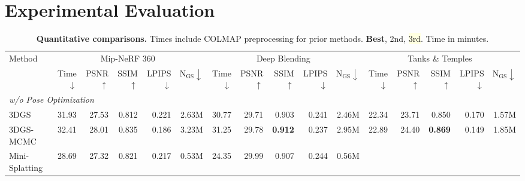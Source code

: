 \documentclass[sigconf]{acmart}
\begin{document}
\section{Experimental Evaluation}
\label{sec:experiments}

\begin{table}[t!]
    \centering
    \footnotesize
    \setlength\tabcolsep{1.5pt}
    \caption{
        \textbf{Quantitative comparisons.} Times include COLMAP preprocessing for prior methods. \colorbox{lightred}{\bf Best}, \colorbox{lightorange}{2nd}, \colorbox{lightyellow}{3rd}. Time in minutes.
    }
    \begin{tabular} {l | rrrrr | rrrrr | rrrrr}
        \toprule
        \multirow{2}{*}{Method}
        & \multicolumn{5}{c}{Mip-NeRF 360~\cite{barron2022mip}}  & \multicolumn{5}{c}{Deep Blending~\cite{hedman2018deep}} & \multicolumn{5}{c}{Tanks \& Temples~\cite{knapitsch2017tanks}} \\
        \cmidrule(l{2pt}r{2pt}){2-6} \cmidrule(l{2pt}r{2pt}){7-11} \cmidrule(l{2pt}r{2pt}){12-16}
         & Time$\downarrow$ & PSNR$\uparrow$ & SSIM$\uparrow$ & LPIPS$\downarrow$ & $\mathrm{N_{GS}}\downarrow$
        & Time$\downarrow$ & PSNR$\uparrow$ & SSIM$\uparrow$ & LPIPS$\downarrow$ & $\mathrm{N_{GS}}\downarrow$
        & Time$\downarrow$ & PSNR$\uparrow$ & SSIM$\uparrow$ & LPIPS$\downarrow$ & $\mathrm{N_{GS}}\downarrow$\\
        \midrule
        \multicolumn{16}{l}{\textit{w/o Pose Optimization}} \\
        \midrule
        3DGS~\cite{kerbl3Dgaussians}
            & 31.93 & 27.53 & 0.812 & 0.221 & 2.63M
            & 30.77 & 29.71 & 0.903 & \cellcolor{tabthird}0.241 & 2.46M
            & 22.34 & 23.71 & 0.850 & 0.170 & 1.57M\\
        3DGS-MCMC~\cite{mcmc3dgs}
            & 32.41 & \cellcolor{tabthird}28.01 & \cellcolor{tabthird}0.835 & 0.186 & 3.23M
            & 31.25 & \cellcolor{tabthird}29.78 & \cellcolor{tabfirst}\bf 0.912 & \cellcolor{tabsecond}0.237 & 2.95M
            & 22.89 & \cellcolor{tabsecond}24.40 & \cellcolor{tabfirst}\bf 0.869 & 0.149 & 1.85M\\
        Mini-Splatting~\cite{fang2024mini}
            & 28.69 & 27.32 & 0.821 & 0.217 & \cellcolor{tabsecond}0.53M
            & 24.35 & \cellcolor{tabsecond}29.99 & \cellcolor{tabsecond}0.907 & 0.244 & \cellcolor{tabthird}0.56M

\end{tabular}
\end{table}
\end{document}
